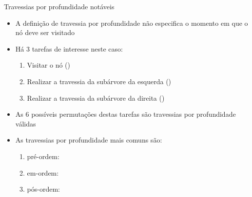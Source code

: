 \begin{frame}[fragile]{Travessias por profundidade notáveis}

	\begin{itemize}
		\item A definição de travessia por profundidade {não} especifica o {momento} em que o 
		nó deve ser visitado

		\item Há 3 {tarefas} de interesse neste caso:

		\begin{enumerate}
			\item {Visitar} o nó ()

			\item Realizar a travessia da subárvore da {esquerda} ()

			\item Realizar a travessia da subárvore da {direita} ()

		\end{enumerate}

		\item As 6 possíveis {permutações} destas tarefas são travessias 
		por profundidade {válidas}

	    \item As travessias por profundidade mais comuns são:

        \begin{enumerate}
            \item pré-ordem: 

            \item em-ordem: 

            \item pós-ordem: 
        \end{enumerate}

    \end{itemize}
\end{frame}

